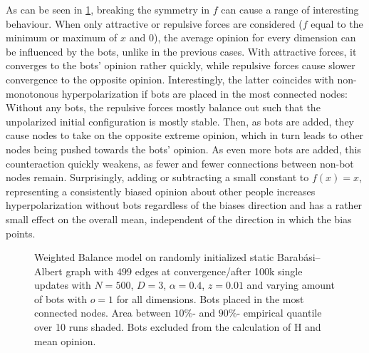 \documentclass[11pt]{article}
\begin{document}
As can be seen in \ref{bots altf}, breaking the symmetry in $f$ can cause a range of interesting behaviour. When only attractive or repulsive forces are considered ($f$ equal to the minimum or maximum of $x$ and $0$), the average opinion for every dimension can be influenced by the bots, unlike in the previous cases. With attractive forces, it converges to the bots' opinion rather quickly, while repulsive forces cause slower convergence to the opposite opinion. Interestingly, the latter coincides with non-monotonous hyperpolarization if bots are placed in the most connected nodes: Without any bots, the repulsive forces mostly balance out such that the unpolarized initial configuration is mostly stable. Then, as bots are added, they cause nodes to take on the opposite extreme opinion, which in turn leads to other nodes being pushed towards the bots' opinion. As even more bots are added, this counteraction quickly weakens, as fewer and fewer connections between non-bot nodes remain.
Surprisingly, adding or subtracting a small constant to $f(x)=x$, representing a consistently biased opinion about other people increases hyperpolarization without bots regardless of the biases direction and has a rather small effect on the overall mean, independent of the direction in which the bias points. 
\begin{figure}[h!]
\caption{Weighted Balance model on randomly initialized static Barabási–Albert graph with $499$ edges at convergence/after 100k single updates with $N=500$, $D=3$, $\alpha=0.4$, $z=0.01$ and varying amount of bots with $o=1$ for all dimensions. Bots placed in the most connected nodes. Area between $10\%$- and $90\%$- empirical quantile over 10 runs shaded. Bots excluded from the calculation of H and mean opinion.}
\label{bots altf}
\end{figure}
\FloatBarrier
\end{document}
